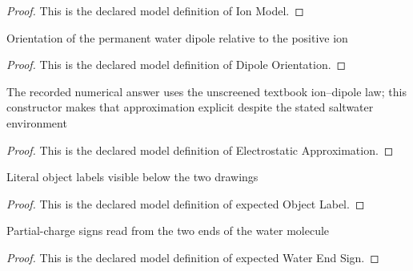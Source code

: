 \begin{proof}
  This is the declared model definition of Ion Model.
\end{proof}
\begin{definition}
  \label{def:physics:phyx-mini-0911:phyxminiproblems-problemphyxmini0911-dipoleorientation}
  Orientation of the permanent water dipole relative to the positive ion
\end{definition}
\begin{proof}
  This is the declared model definition of Dipole Orientation.
\end{proof}
\begin{definition}
  \label{def:physics:phyx-mini-0911:phyxminiproblems-problemphyxmini0911-electrostaticapproximation}
  The recorded numerical answer uses the unscreened textbook ion--dipole law; this constructor makes that approximation explicit despite the stated saltwater environment
\end{definition}
\begin{proof}
  This is the declared model definition of Electrostatic Approximation.
\end{proof}
\begin{definition}
  \label{def:physics:phyx-mini-0911:phyxminiproblems-problemphyxmini0911-expectedobjectlabel}
  Literal object labels visible below the two drawings
\end{definition}
\begin{proof}
  This is the declared model definition of expected Object Label.
\end{proof}
\begin{definition}
  \label{def:physics:phyx-mini-0911:phyxminiproblems-problemphyxmini0911-expectedwaterendsign}
  Partial-charge signs read from the two ends of the water molecule
\end{definition}
\begin{proof}
  This is the declared model definition of expected Water End Sign.
\end{proof}
